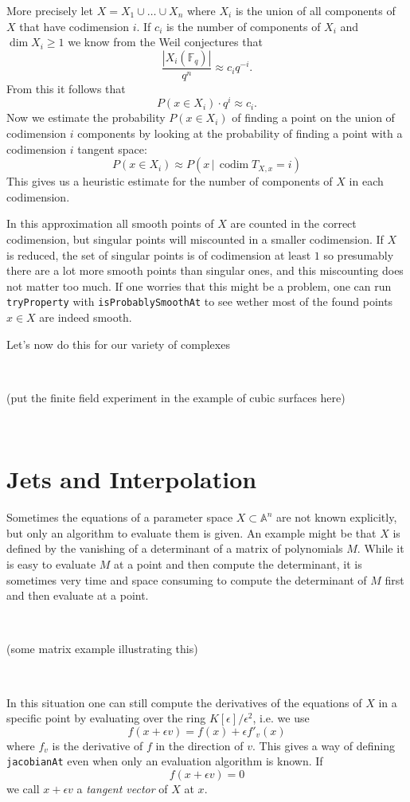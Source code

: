 \documentclass[12pt,a4paper]{amsart}
\theoremstyle{plain}
\theoremstyle{definition}
\newcommand{\FF}{\mathbb F}
\renewcommand{\AA}{\mathbb A}
\DeclareMathOperator{\codim}{codim}
\begin{document}
More precisely let $X = X_1 \cup \dots \cup X_n$ where $X_i$ is the union of all components of $X$ that have codimension $i$. If $c_i$ is the number of components of $X_i$ and $\dim X_i \ge 1$ we know from the Weil conjectures that
\[
	\frac{|X_i(\FF_q) |}{q^n} \approx c_i q^{-i}.
\]
From this it follows that
\[
	P(x \in X_i) \cdot q^i \approx c_i.
\]
Now we estimate the probability $P(x \in X_i)$ of finding a point on the union of codimension $i$ components by looking at the probability of finding a point with a codimension $i$ tangent space:
\[
	P(x \in X_i) \approx P(x \, | \, \codim T_{X,x} = i )
\]
This gives us a heuristic estimate for the number of components of $X$ in each codimension.

In this approximation all smooth points of $X$ are counted in the correct codimension, but singular points will miscounted in a smaller codimension. If $X$ is reduced, the set of singular points is of codimension at least $1$ so presumably there are a lot more smooth points than singular ones, and this miscounting does not matter too much. If one worries that this might be a problem, one can run {\tt tryProperty} with {\tt isProbablySmoothAt} to see wether most of the found points $x \in  X$ are indeed smooth. 

Let's now do this for our variety of complexes

\

{\color{red} (put the finite field experiment in the example of cubic surfaces here)}

\


\section{Jets and Interpolation}

Sometimes the equations of a parameter space $X \subset \AA^n$ are not known explicitly, but only an algorithm to evaluate them is given. An example might be that $X$ is defined by the vanishing of a determinant of a matrix  of polynomials $M$. While it is easy to evaluate $M$ at a point and then compute the determinant, it is sometimes very time and space consuming to compute the determinant of $M$ first and then evaluate at a point.

\

{\color{red} (some matrix example illustrating this)}

\

In this situation one can still compute the derivatives of the equations of $X$ in a specific point by evaluating over the ring $K[\epsilon]/\epsilon^2$, i.e. we use
\[
	f(x + \epsilon v) = f(x) + \epsilon f'_v(x)
\]
where $f_v$ is the derivative of $f$ in the direction of $v$. This gives a way of defining {\tt jacobianAt} even when only an evaluation algorithm is known. If
\[
	f(x + \epsilon v) = 0
\]
we call $x + \epsilon v$ a {\sl tangent vector} of $X$ at $x$.
\end{document}
